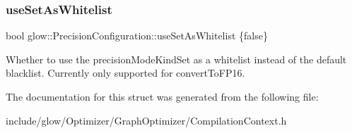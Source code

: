 \subsubsection{\texorpdfstring{use\+Set\+As\+Whitelist}{useSetAsWhitelist}}
{\footnotesize\ttfamily bool glow\+::\+Precision\+Configuration\+::use\+Set\+As\+Whitelist \{false\}}

Whether to use the precision\+Mode\+Kind\+Set as a whitelist instead of the default blacklist. Currently only supported for convert\+To\+F\+P16. 

The documentation for this struct was generated from the following file\+:\begin{DoxyCompactItemize}
\item 
include/glow/\+Optimizer/\+Graph\+Optimizer/Compilation\+Context.\+h\end{DoxyCompactItemize}
